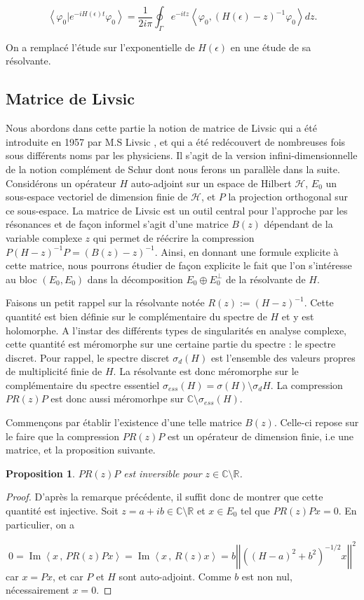 \documentclass[12pt,openany,a4paper, titlepage]{article}
\newcommand{\f}[2]{\frac{#1}{#2}}
\newcommand{\lp}{\left(}
\newcommand{\rp}{\right)}
\newcommand{\lb}{\left|}
\newcommand{\rb}{\right|}
\newcommand{\la}{\left\langle}
\newcommand{\ra}{\right\rangle}
\newcommand{\R}{\mathbb{R}}
\newcommand{\C}{\mathbb{C}}
\newcommand{\HH}{\mathcal{H}}
\newcommand{\vp}{\varphi}
\newcommand{\He}{H(\epsilon)}
\newcommand{\inv}{^{-1}}
\newcommand{\im}{\operatorname{Im}}
\newtheorem{prop}{Proposition}
\theoremstyle{definition}
\theoremstyle{definition}
\theoremstyle{definition}
\theoremstyle{definition}
\theoremstyle{definition}
\theoremstyle{definition}
\begin{document}
\begin{equation}
    \la \vp_0 | e^{-i\He t} \vp_0\ra = \f{1}{2i\pi}\oint_\Gamma e^{-itz}\la \varphi_0,\lp H(\epsilon)  -z \rp^{-1} \varphi_0 \ra dz.
\end{equation}

On a remplacé l'étude sur l'exponentielle de $\He$ en une étude de sa résolvante.

\subsection{Matrice de Livsic}

Nous abordons dans cette partie la notion de matrice de Livsic qui a été introduite en 1957 par M.S Livsic \cite{HOWLAND1975415}, et qui a été redécouvert de nombreuses fois sous différents noms par les physiciens. Il s'agit de la version infini-dimensionnelle de la notion complément de Schur dont nous ferons un parallèle dans la suite. Considérons un opérateur $H$ auto-adjoint sur un espace de Hilbert $\HH$, $E_0$ un sous-espace vectoriel de dimension finie de $\HH$, et $P$ la projection orthogonal sur ce sous-espace. La matrice de Livsic est un outil central pour l'approche par les résonances et de façon informel s'agit d'une matrice $B(z)$ dépendant de la variable complexe $z$ qui permet de réécrire la compression $P(H-z)\inv P = (B(z) -z)\inv$. Ainsi, en donnant une formule explicite à cette matrice, nous pourrons étudier de façon explicite le fait que l'on s'intéresse au bloc $(E_0,E_0)$ dans la décomposition $E_0\oplus E_0^\perp$ de la résolvante de $H$.

Faisons un petit rappel sur la résolvante notée $R(z) := (H-z)\inv$. Cette quantité est bien définie sur le complémentaire du spectre de $H$ et y est holomorphe. A l'instar des différents types de singularités en analyse complexe, cette quantité est méromorphe sur une certaine partie du spectre : le spectre discret. Pour rappel, le spectre discret $\sigma_d(H)$ est l'ensemble des valeurs propres de multiplicité finie de $H$. La résolvante est donc méromorphe sur le complémentaire du spectre essentiel $\sigma_{ess}(H) = \sigma(H)\setminus\sigma_d H$. La compression $PR(z)P$ est donc aussi méromorhpe sur  $\C\setminus\sigma_{ess}(H)$.

Commençons par établir l'existence d'une telle matrice $B(z)$. Celle-ci repose sur le faire que la compression $PR(z)P$ est un opérateur de dimension finie, i.e une matrice, et la proposition suivante.

\begin{prop}
    $PR(z)P$ est inversible pour $z\in\C\setminus\R$.
\end{prop}
\begin{proof}
    D'après la remarque précédente, il suffit donc de montrer que cette quantité est injective. Soit $z = a+ib\in\C\setminus\R$ et $x\in E_0$ tel que $PR(z)Px = 0$. En particulier, on a 

    $$0 = \im\la x\,,\, PR(z)Px \ra = \im\la x\,,\, R(z)x \ra = b\lb\lb\lp (H-a)^2 + b^2 \rp^{-1/2}x\rb\rb^2$$
    car $x = Px$, et car $P$ et $H$ sont auto-adjoint. Comme $b$ est non nul, nécessairement $x = 0$.
\end{proof}
\end{document}
